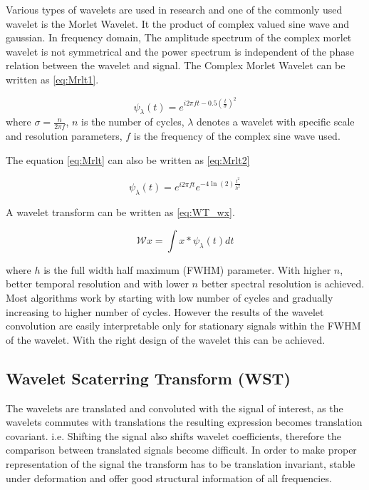 
Various types of wavelets are used in research and one of the commonly used wavelet is the Morlet Wavelet. It the product of complex valued sine wave and gaussian. In frequency domain, The amplitude spectrum of the complex morlet wavelet is not symmetrical and the power spectrum is independent of the phase relation between the wavelet and signal. The Complex Morlet Wavelet can be written as \ref{eq:Mrlt1}.

\begin{equation} \label{eq:Mrlt1}
    \psi_\lambda(t) = e^{i2\pi ft -0.5(\frac{t}{\sigma})^2}
\end{equation}
where $\sigma = \frac{n}{2\pi f}$, $n$ is the number of cycles, $\lambda$ denotes a wavelet with specific scale and resolution parameters, $f$ is the frequency of the complex sine wave used.

The equation \ref*{eq:Mrlt} can also be written as  \ref*{eq:Mrlt2}

\begin{equation} \label{eq:Mrlt2}
    \psi_\lambda(t) = e^{i2\pi ft} e^{-4\ln(2)\frac{t^2}{h^2}}
\end{equation}

A wavelet transform can be written as \ref{eq:WT_wx}.

\begin{equation} \label{eq:WT_wx}
    \mathcal{W}x  = \int x \ast \psi_\lambda(t) dt
\end{equation}

where $h$ is the full width half maximum (FWHM) parameter. With higher $n$, better temporal resolution and with lower $n$ better spectral resolution is achieved. Most algorithms work by starting with low number of cycles and gradually increasing to higher number of cycles. However the results of the wavelet convolution are easily interpretable only for stationary signals within the FWHM of the wavelet. With the right design of the wavelet this can be achieved.

\subsection{Wavelet Scaterring Transform (WST)}
The wavelets are translated and convoluted with the signal of interest, as the wavelets commutes with translations the resulting expression becomes translation covariant. i.e. Shifting the signal also shifts wavelet coefficients, therefore the comparison between translated signals become difficult. In order to make proper representation of the signal the transform has to be translation invariant, stable under deformation and offer good structural information of all frequencies.

